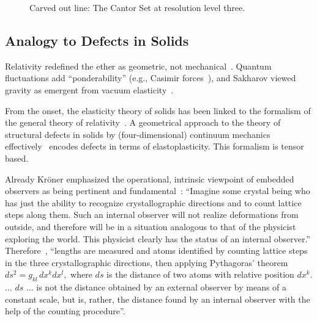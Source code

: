 \documentclass[%
  reprint,
  superscriptaddress,
  showpacs,
  showkeys,
  amsmath,amssymb,
  pra,
  longbibliography,
  floatfix,
]{revtex4-2}
\begin{document}
\begin{figure}[ht]
\centering
{}
\caption{Carved out line:  The Cantor Set at resolution level three.}
\label{fig:Cantor}
\end{figure}


\subsection{Analogy to Defects in Solids}
Relativity redefined the ether as geometric, not mechanical~\cite{einstein-aether-en}. Quantum fluctuations add ``ponderability'' (e.g., Casimir forces~\cite{Casimir_1948}), and Sakharov viewed gravity as emergent from vacuum elasticity~\cite{Sakharov-67}.

From the onset, the elasticity theory of solids has been linked to the formalism of the general theory of relativity~\cite{schaefer-1953,zaanen-2022}.
A geometrical approach to the theory of structural defects in solids by (four-dimensional)
continuum mechanics~\cite{Kroner-1958,kroner-1959,Kosevich-1962,Turski-66,kroner-1967,kroner-1975,Kossecka_deWit-77,kroner-1985,kroner-1990,kroner-2001,amari-1968,gunther-1972,Guenther-1979,gunther-1981,gunther-1983,golebiewska-lasota-1979a,golebiewska-lasota-1979b}
effectively~\cite{anderson:73} encodes defects in terms of  elastoplasticity.
This formalism is tensor based.

Already Kr\"oner emphasized the
operational, intrinsic viewpoint of embedded observers as being pertinent and fundamental~\cite{kroner-1990}:
``Imagine some crystal being who has just the ability to recognize
crystallographic directions and to count lattice steps along them. Such an
internal observer will not realize deformations from outside, and therefore
will be in a situation analogous to that of the physicist exploring the world.
This physicist clearly has the status of an internal observer.''
Therefore~\cite{kroner-1985}, ``lengths are measured and atoms identified by
counting lattice steps in the three crystallographic directions, then applying Pythagoras' theorem
$
ds^2 = g_{kl}\, dx^k dx^l,
$
where $ds$ is the distance of two atoms with relative position $dx^k$.
$\ldots$
$ds$ $\ldots$ is not the distance obtained by
an external observer by means of a constant scale, but is, rather, the distance found
by an internal observer with the help of the counting procedure''.
\end{document}
